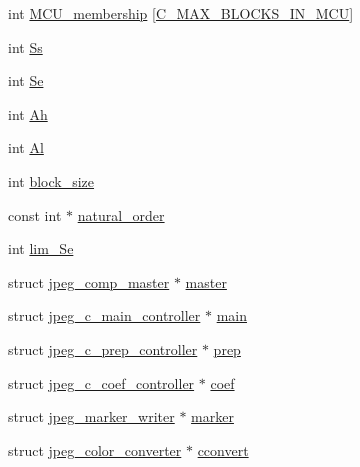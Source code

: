 \begin{DoxyCompactItemize}
int \mbox{\hyperlink{structjpeg__compress__struct_a6debf977451892aae1116b47c5c1c95f}{M\+C\+U\+\_\+membership}} \mbox{[}\mbox{\hyperlink{jpeglib_8h_a4f270f4efb3fc0bb09f0d5ffa51ca327}{C\+\_\+\+M\+A\+X\+\_\+\+B\+L\+O\+C\+K\+S\+\_\+\+I\+N\+\_\+\+M\+CU}}\mbox{]}
\item 
int \mbox{\hyperlink{structjpeg__compress__struct_adda4b7ef0dda94b38b6e34df42769d81}{Ss}}
\item 
int \mbox{\hyperlink{structjpeg__compress__struct_af2c1fe7c62791cda75219c10d71132d9}{Se}}
\item 
int \mbox{\hyperlink{structjpeg__compress__struct_a301a95efc904d22aca78592f7a21673a}{Ah}}
\item 
int \mbox{\hyperlink{structjpeg__compress__struct_a4160152697f6042b8fe1d6838a8118e2}{Al}}
\item 
int \mbox{\hyperlink{structjpeg__compress__struct_aad43e172d1ec5dd1e369b72ed8753410}{block\+\_\+size}}
\item 
const int $\ast$ \mbox{\hyperlink{structjpeg__compress__struct_a40fe112672c5c26f6bc53978a2b9a2a1}{natural\+\_\+order}}
\item 
int \mbox{\hyperlink{structjpeg__compress__struct_acb8a6365a8225a8d14d88b5d3c1d03c3}{lim\+\_\+\+Se}}
\item 
struct \mbox{\hyperlink{structjpeg__comp__master}{jpeg\+\_\+comp\+\_\+master}} $\ast$ \mbox{\hyperlink{structjpeg__compress__struct_a50b9c60f47c9fff393d7d5b3a7b3618e}{master}}
\item 
struct \mbox{\hyperlink{structjpeg__c__main__controller}{jpeg\+\_\+c\+\_\+main\+\_\+controller}} $\ast$ \mbox{\hyperlink{structjpeg__compress__struct_ab1bb86e9c2ade498b09a9a19d60e6570}{main}}
\item 
struct \mbox{\hyperlink{structjpeg__c__prep__controller}{jpeg\+\_\+c\+\_\+prep\+\_\+controller}} $\ast$ \mbox{\hyperlink{structjpeg__compress__struct_a66875fd858cd11fb7a696a717c5c7b76}{prep}}
\item 
struct \mbox{\hyperlink{structjpeg__c__coef__controller}{jpeg\+\_\+c\+\_\+coef\+\_\+controller}} $\ast$ \mbox{\hyperlink{structjpeg__compress__struct_ad54865b66c30ce332c6757d56393dedc}{coef}}
\item 
struct \mbox{\hyperlink{structjpeg__marker__writer}{jpeg\+\_\+marker\+\_\+writer}} $\ast$ \mbox{\hyperlink{structjpeg__compress__struct_a909e4ca5c3c48f380a53cc1b068eea12}{marker}}
\item 
struct \mbox{\hyperlink{structjpeg__color__converter}{jpeg\+\_\+color\+\_\+converter}} $\ast$ \mbox{\hyperlink{structjpeg__compress__struct_a7c51e665f18d6e5a0fed053c470f4914}{cconvert}}

\end{DoxyCompactItemize}
